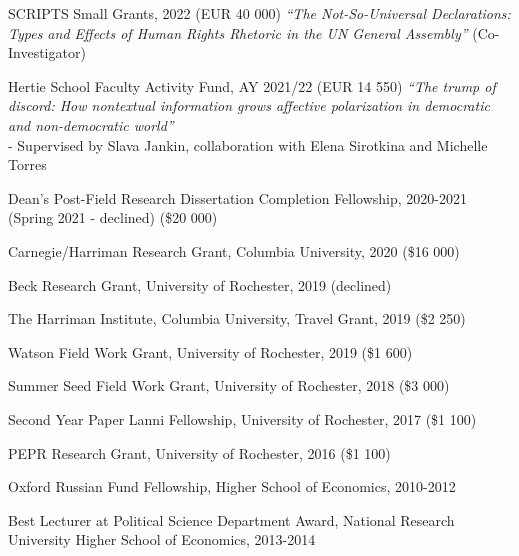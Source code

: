\documentclass[margin,line,10.95pt]{res}
\begin{document}
\begin{resume}
SCRIPTS Small Grants, 2022 (EUR 40 000) \textit{“The Not-So-Universal Declarations: Types and Effects of Human Rights Rhetoric in the UN General Assembly”} (Co-Investigator)

\vspace*{-3.5mm}

Hertie School Faculty Activity Fund, AY 2021/22 (EUR 14 550) \textit{“The trump of discord: How nontextual information grows affective polarization in democratic and non-democratic world”} 
\\
- Supervised by Slava Jankin, collaboration with Elena Sirotkina and Michelle Torres
\\

\vspace*{-4.5mm}

Dean's Post-Field Research Dissertation Completion Fellowship, 2020-2021 (Spring 2021 - declined) (\$20 000)
\vspace*{-4.5mm}

Carnegie/Harriman Research Grant, Columbia University, 2020 (\$16 000)
\vspace*{-4.5mm}

Beck Research Grant, University of Rochester, 2019 (declined)
\vspace*{-4.5mm}

The Harriman Institute, Columbia University, Travel Grant, 2019 (\$2 250)
\vspace*{-4.5mm}

Watson Field Work Grant, University of Rochester, 2019 (\$1 600)
\vspace*{-4.5mm}

Summer Seed Field Work Grant, University of Rochester, 2018 (\$3 000)
\vspace*{-4.5mm}

Second Year Paper Lanni Fellowship, University of Rochester, 2017 (\$1 100)
\vspace*{-4.5mm}

PEPR Research Grant, University of Rochester, 2016 (\$1 100)
\vspace*{-4.5mm}


Oxford Russian Fund Fellowship, Higher School of Economics, 2010-2012 
\vspace*{-2.5mm}

Best Lecturer at Political Science Department Award, National Research University Higher School of Economics, 2013-2014 
\vspace*{-4.5mm}


\end{resume}
\end{document}

